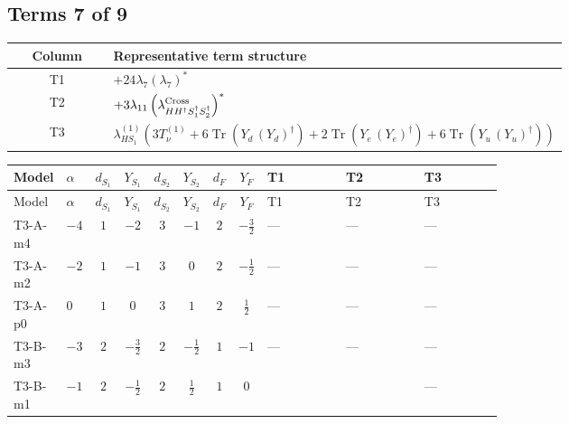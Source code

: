 \documentclass[8pt]{article}
\begin{document}
\begin{landscape}
\subsection*{Terms 7 of 9}
\begin{center}
\begin{tabular}{@{}c >{\raggedright\arraybackslash}p{0.82\linewidth}@{}}
\toprule
Column & Representative term structure \\
\midrule
T1 & \(\displaystyle +24 {\lambda_{7}} \left({\lambda_{7}}\right)^{*}\) \\
\midrule
T2 & \(\displaystyle +3 {\lambda_{11}} \left({\lambda_{H H^\dagger S_1^\dagger S_2^\dagger}^{\rm Cross}}\right)^{*}\) \\
\midrule
T3 & \(\displaystyle {\lambda_{HS_1}^{(1)}} (3 T_{\nu}^{(1)}+6 \operatorname{Tr}\!\left({Y_d}\,\left({Y_d}\right)^{\dagger}\right)+2 \operatorname{Tr}\!\left({Y_e}\,\left({Y_e}\right)^{\dagger}\right)+6 \operatorname{Tr}\!\left({Y_u}\,\left({Y_u}\right)^{\dagger}\right))\) \\
\midrule
\bottomrule
\end{tabular}
\end{center}
\smallskip
\tiny
\begin{longtable}{@{}llcccccc >{\raggedright\arraybackslash}p{0.21\linewidth} >{\raggedright\arraybackslash}p{0.21\linewidth} >{\raggedright\arraybackslash}p{0.21\linewidth}@{}}
\toprule
Model & $\alpha$ & $d_{S_1}$ & $Y_{S_1}$ & $d_{S_2}$ & $Y_{S_2}$ & $d_F$ & $Y_F$ & T1 & T2 & T3 \\
\midrule
\endfirsthead
\toprule
Model & $\alpha$ & $d_{S_1}$ & $Y_{S_1}$ & $d_{S_2}$ & $Y_{S_2}$ & $d_F$ & $Y_F$ & T1 & T2 & T3 \\
\midrule
\endhead
T3-A-m4 & $-4$ & $1$ & $-2$ & $3$ & $-1$ & $2$ & $-\frac{3}{2}$ & --- & --- & --- \\
\midrule
T3-A-m2 & $-2$ & $1$ & $-1$ & $3$ & $0$ & $2$ & $-\frac{1}{2}$ & --- & --- & --- \\
\midrule
T3-A-p0 & $0$ & $1$ & $0$ & $3$ & $1$ & $2$ & $\frac{1}{2}$ & --- & --- & --- \\
\midrule
T3-B-m3 & $-3$ & $2$ & $-\frac{3}{2}$ & $2$ & $-\frac{1}{2}$ & $1$ & $-1$ & --- & --- & --- \\
\midrule
T3-B-m1 & $-1$ & $2$ & $-\frac{1}{2}$ & $2$ & $\frac{1}{2}$ & $1$ & $0$ & \scriptsize\adjustbox{max width=\linewidth}{$\begin{gathered} +24 {\lambda_{7}} \left({\lambda_{7}}\right)^{*}\end{gathered}$} & \scriptsize\adjustbox{max width=\linewidth}{$\begin{gathered} +3 {\lambda_{11}} \left({\lambda_{H H^\dagger S_1^\dagger S_2^\dagger}^{\rm Cross}}\right)^{*}\end{gathered}$} & --- \\

\end{longtable}
\end{landscape}
\end{document}
